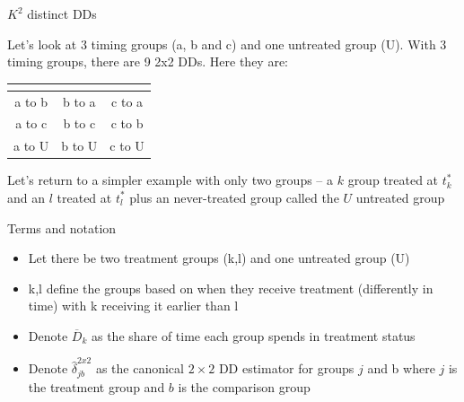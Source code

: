 \documentclass{beamer}
\begin{document}
\begin{frame}{$K^2$ distinct DDs}

Let's look at 3 timing groups (a, b and c) and one untreated group (U).  With 3 timing groups, there are 9 2x2 DDs.  Here they are:


\begin{center}
\begin{tabular}{c|c|c}
\multicolumn{1}{l}{} &
\multicolumn{1}{l}{} &
\multicolumn{1}{l}{} \\
\midrule
a to b & b to a & c to a \\
a to c & b to c & c to b \\
a to U & b to U & c to U \\
\midrule
\end{tabular}
\end{center}

\bigskip

Let's return to a simpler example with only two groups -- a $k$ group treated at $t_k^*$ and an $l$ treated at $t_l^*$ plus an never-treated group called the $U$ untreated group
\end{frame} 


\begin{frame}{Terms and notation}

\begin{itemize}
\item Let there be two treatment groups (k,l) and one untreated group (U)
\item k,l define the groups based on when they receive treatment (differently in time) with k receiving it earlier than l
\item Denote $\overline{D}_k$ as the share of time each group spends in treatment status
\item Denote $\widehat{\delta}_{jb}^{2x2}$ as the canonical $2\times 2$ DD estimator for groups $j$ and b where $j$ is the treatment group and $b$ is the comparison group
\end{itemize}

\end{frame}


\end{document}
